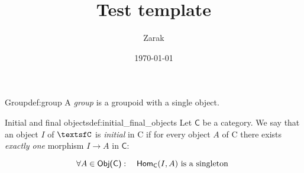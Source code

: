 \documentclass[a4paper]{article}
\title{Test template}
\author{Zarak}
\date{\today}
\newcommand{\cat}{%
  \textsf%
}
\theoremstyle{definition}
\begin{document}
\maketitle

\begin{definition}{Group}{def:group}
  A \textit{group} is a groupoid with a single object.
\end{definition}

\begin{definition}{Initial and final objects}{def:initial_final_objects}
  Let $\cat{C}$ be a category. We say that an object $I$ of $\cat C$ is
  \textit{initial} in \cat{C} if for every object $A$ of \cat{C} there exists
  \textit{exactly one} morphism $I \to  A$ in $\cat{C}$:

  \begin{equation*}
    \forall A \in \cat{Obj(C)} : \quad \cat{Hom}_\cat{C}(I, A) \text{ is
    a singleton }
  \end{equation*}
\end{definition}
\end{document}
